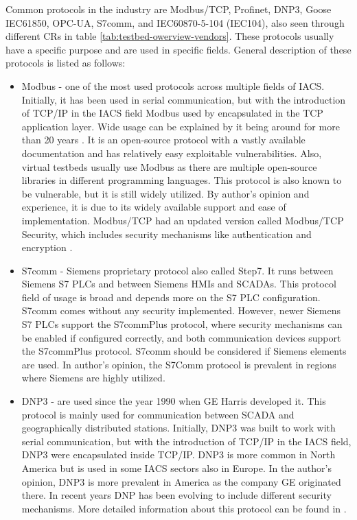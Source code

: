 Common protocols in the industry are Modbus/TCP, Profinet, DNP3, Goose IEC61850, OPC-UA, S7comm, and IEC60870-5-104 (IEC104), also seen through different CRs in table 
\ref{tab:testbed-owerview-vendors}. These protocols usually have a specific purpose and are used in specific fields. General description of these protocols is listed as follows:

\begin{itemize}
	\item Modbus - one of the most used protocols across multiple fields of IACS. Initially, it has been used in serial communication, but with the introduction of TCP/IP in the IACS field Modbus used by encapsulated in the TCP application layer. Wide usage can be explained by it being around for more than 20 years \parencite{WEB-21-modbus-main-page}. It is an open-source protocol with a vastly available documentation and has relatively easy exploitable vulnerabilities. Also, virtual testbeds usually use Modbus as there are multiple open-source libraries in different programming languages. This protocol is also known to be vulnerable, but it is still widely utilized. By author's opinion and experience, it is due to its widely available support and ease of implementation. Modbus/TCP had an updated version called Modbus/TCP Security, which includes security mechanisms like authentication and encryption \parencite{WEB-21-modbus-main-page}.
	
	\item S7comm - Siemens proprietary protocol also called Step7. It runs between Siemens S7 PLCs and between Siemens HMIs and SCADAs. This protocol field of usage is broad and depends more on the S7 PLC configuration. S7comm comes without any security implemented. However, newer Siemens S7 PLCs support the S7commPlus protocol, where security mechanisms can be enabled if configured correctly, and both communication devices support the S7commPlus protocol. S7comm should be considered if Siemens elements are used. In author's opinion, the S7Comm protocol is prevalent in regions where Siemens are highly utilized.
	
	\item DNP3 - are used since the year 1990 when GE Harris developed it. This protocol is mainly used for communication between SCADA and geographically distributed stations. Initially, DNP3 was built to work with serial communication, but with the introduction of TCP/IP in the IACS field, DNP3 were encapsulated inside TCP/IP. DNP3 is more common in North America but is used in some IACS sectors also in Europe. In the author's opinion, DNP3 is more prevalent in America as the company GE originated there. In recent years DNP has been evolving to include different security mechanisms. More detailed information about this protocol can be found in \parencite{WEB-27-dnp3-oficial}.
	

\end{itemize}
